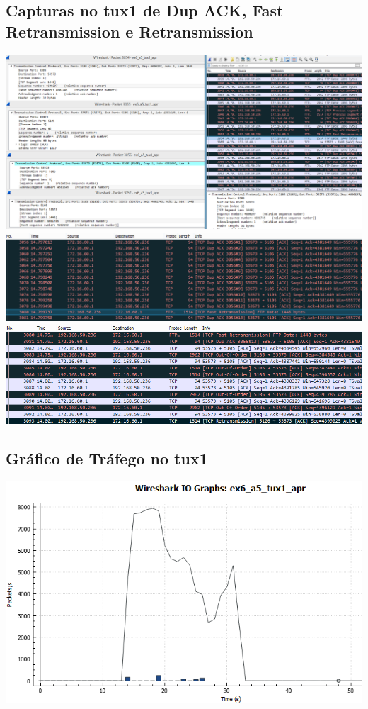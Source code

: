 \documentclass[11pt,a4paper,reqno]{report}
\numberwithin{equation}{section}
\begin{document}
\begin{appendices}
\subsection{Capturas no tux1 de Dup ACK, Fast Retransmission e Retransmission}
\label{ex6_retrans}
\includegraphics[width=16cm]{ex6_tux1_3054.png}
\includegraphics[width=16cm]{ex6_tux1_fastretransmission.png}
\includegraphics[width=16cm]{ex6_tux1_retransmission.png}

\subsection{Gráfico de Tráfego no tux1}
\label{ex6_a5_1io}
\includegraphics[width=16cm]{ex6_a5_tux1_IO.png}

\end{appendices}
\end{document}
